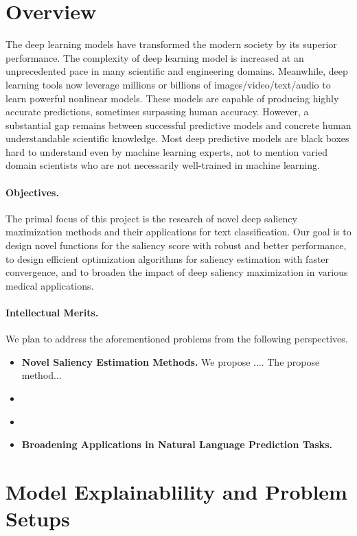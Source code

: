 
\section{Overview}

The deep learning models have transformed the modern society by its superior
performance. The complexity of deep learning model is increased at an
unprecedented pace in many scientific and engineering domains. Meanwhile, deep
learning tools now leverage millions or billions of images/video/text/audio to
learn powerful nonlinear models. These models are capable of producing highly
accurate predictions, sometimes surpassing human accuracy. However, a
substantial gap remains between successful predictive models and concrete human
understandable scientific knowledge. Most deep predictive models are black boxes hard to understand even by machine learning experts, not to mention varied domain scientists who are not necessarily well-trained in machine learning. 

\paragraph{Objectives.}
The primal focus of this project is the research of novel deep saliency
maximization methods and their applications for text classification. Our goal is
to design novel functions for the saliency score with robust and better
performance, to design efficient optimization algorithms for saliency estimation
with faster convergence, and to broaden the impact of deep saliency maximization
in various medical applications.

\paragraph{Intellectual Merits.} We plan to address the aforementioned problems
from the following perspectives.
\begin{itemize}
\item \textbf{Novel Saliency Estimation Methods.} We propose .... The propose
  method...
\item \textbf{}
\item \textbf{}
\item \textbf{Broadening Applications in Natural Language Prediction Tasks.} 
\end{itemize}


\section{Model Explainablility and Problem Setups}

